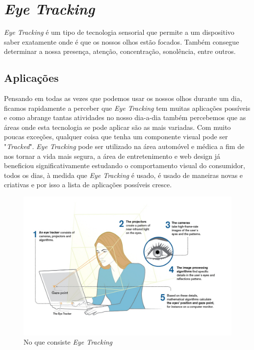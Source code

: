 \documentclass{llncs}
\begin{document}
\newpage


\section{\textit{Eye Tracking}}
\textit{Eye Tracking} é um tipo de tecnologia sensorial que permite a um dispositivo saber exatamente onde é que os nossos olhos estão focados. Também consegue determinar a nossa presença, atenção, concentração, sonolência, entre outros. \cite{onl6}

\subsection{Aplicações}
Pensando em todas as vezes que podemos usar os nossos olhos durante um dia, ficamos rapidamente a perceber que \textit{Eye Tracking} tem muitas aplicações possíveis e como abrange tantas atividades no nosso dia-a-dia também percebemos que as áreas onde esta tecnologia se pode aplicar são as mais variadas. Com muito poucas exceções, qualquer coisa que tenha um componente visual pode ser "\textit{Tracked}". \textit{Eye Tracking} pode ser utilizado na área automóvel e médica a fim de nos tornar a vida mais segura, a área de entretenimento e web design já beneficiou significativamente estudando o comportamento visual do consumidor, todos os dias, à medida que \textit{Eye Tracking} é usado, é usado de maneiras novas e criativas e por isso a lista de aplicações possíveis cresce. \cite{onl7} 

\begin{figure}[!ht]
\centering
\includegraphics[width=120mm]{eyetracking.jpg}
\caption{No que consiste \textit{Eye Tracking} \cite{onl6}}
\end{figure}
\end{document}
